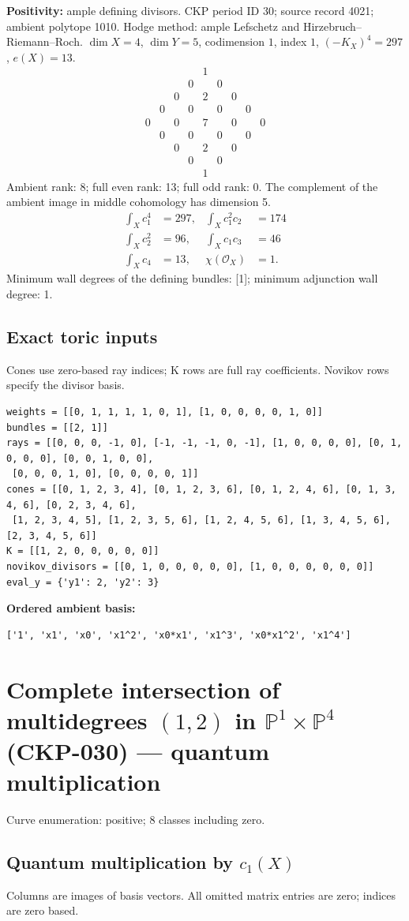 \documentclass[10pt,a4paper]{article}
\newcommand{\hodge}[4]{\begin{array}{ccccccccc}
&&&&1&&&&\\&&&0&&0&&&\\&&0&&#1&&0&&\\&0&&#2&&#2&&0&\\
0&&#3&&#4&&#3&&0\\&0&&#2&&#2&&0&\\&&0&&#1&&0&&\\&&&0&&0&&&\\&&&&1&&&&\end{array}}
\begin{document}
\textbf{Positivity:} ample defining divisors.
CKP period ID 30; source record 4021; ambient polytope 1010.
Hodge method: ample Lefschetz and Hirzebruch--Riemann--Roch.
$\dim X=4$, $\dim Y=5$, codimension $1$, index $1$, $(-K_X)^4=297$, $e(X)=13$.
\[\hodge{2}{0}{0}{7}\]
Ambient rank: 8; full even rank: 13; full odd rank: 0. The complement of the ambient image in middle cohomology has dimension 5.
\[\begin{aligned}\int_Xc_1^4&=297,&\int_Xc_1^2c_2&=174\\\int_Xc_2^2&=96,&\int_Xc_1c_3&=46\\\int_Xc_4&=13,&\chi(\mathcal O_X)&=1.\end{aligned}\]
Minimum wall degrees of the defining bundles: [1]; minimum adjunction wall degree: 1.
\subsection*{Exact toric inputs}
Cones use zero-based ray indices; K rows are full ray coefficients. Novikov rows specify the divisor basis.

\begin{lstlisting}
weights = [[0, 1, 1, 1, 1, 0, 1], [1, 0, 0, 0, 0, 1, 0]]
bundles = [[2, 1]]
rays = [[0, 0, 0, -1, 0], [-1, -1, -1, 0, -1], [1, 0, 0, 0, 0], [0, 1, 0, 0, 0], [0, 0, 1, 0, 0],
 [0, 0, 0, 1, 0], [0, 0, 0, 0, 1]]
cones = [[0, 1, 2, 3, 4], [0, 1, 2, 3, 6], [0, 1, 2, 4, 6], [0, 1, 3, 4, 6], [0, 2, 3, 4, 6],
 [1, 2, 3, 4, 5], [1, 2, 3, 5, 6], [1, 2, 4, 5, 6], [1, 3, 4, 5, 6], [2, 3, 4, 5, 6]]
K = [[1, 2, 0, 0, 0, 0, 0]]
novikov_divisors = [[0, 1, 0, 0, 0, 0, 0], [1, 0, 0, 0, 0, 0, 0]]
eval_y = {'y1': 2, 'y2': 3}
\end{lstlisting}

\textbf{Ordered ambient basis:}
\begin{lstlisting}
['1', 'x1', 'x0', 'x1^2', 'x0*x1', 'x1^3', 'x0*x1^2', 'x1^4']
\end{lstlisting}

\clearpage\section*{Complete intersection of multidegrees $(1,2)$ in $\mathbb P^{1}\times \mathbb P^{4}$ (CKP-030) --- quantum multiplication}

Curve enumeration: positive; 8 classes including zero.
\subsection*{Quantum multiplication by $c_1(X)$}
Columns are images of basis vectors. All omitted matrix entries are zero; indices are zero based.
\end{document}
